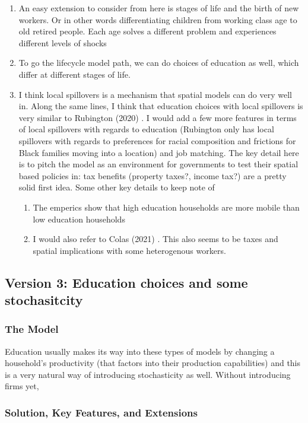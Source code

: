 \documentclass[11pt,english]{article}
\begin{document}
\begin{enumerate}
\item An easy extension to consider from here is stages of life and the birth of new workers. Or in other words differentiating children from working class age to old retired people. Each age solves a different problem and experiences different levels of shocks 

\item To go the lifecycle model path, we can do choices of education as well, which differ at different stages of life.

\item I think local spillovers is a mechanism that spatial models can do very well in. Along the same lines, I think that education choices with local spillovers is very similar to Rubington (2020) \cite{Rubington2022}. I would add a few more features in terms of local spillovers with regards to education (Rubington only has local spillovers with regards to preferences for racial composition and frictions for Black families moving into a location) and job matching. The key detail here is to pitch the model as an environment for governments to test their spatial based policies in: tax benefits (property taxes?, income tax?) are a pretty solid first idea. Some other key details to keep note of
\begin{enumerate}
\item The emperics show that high education households are more mobile than low education households

\item I would also refer to Colas (2021) \cite{Colas2021}. This also seems to be taxes and spatial implications with some heterogenous workers.
\end{enumerate}
\end{enumerate}


\subsection{Version 3: Education choices and some stochasitcity}

\subsubsection{The Model}

Education usually makes its way into these types of models by changing a household's productivity (that factors into their production capabilities) and this is a very natural way of introducing stochasticity as well. Without introducing firms yet, 

\subsubsection{Solution, Key Features, and Extensions}




\newpage




\end{document}
